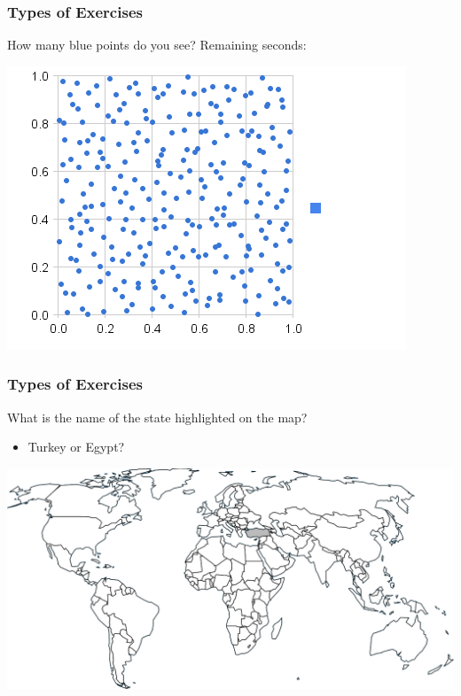 \documentclass[xcolor=svgnames]{beamer}
\begin{document}
\begin{frame}
	\frametitle{Types of Exercises}
	How many blue points do you see? Remaining seconds: {\Huge{}\only<10>{1}}

	\begin{center}
		\medskip
		\includegraphics[width=.7\textwidth]{imgs/random-plot.png}
	\end{center}
\end{frame}
\begin{frame}
\end{frame}
\begin{frame}
	\frametitle{Types of Exercises}
	What is the name of the state highlighted on the map?
	\begin{itemize}
		\item 	Turkey or Egypt?
	\end{itemize}
	\begin{center}
		\medskip
		\includegraphics[width=.95\textwidth]{imgs/map.png}
	\end{center}
\end{frame}
\end{document}
